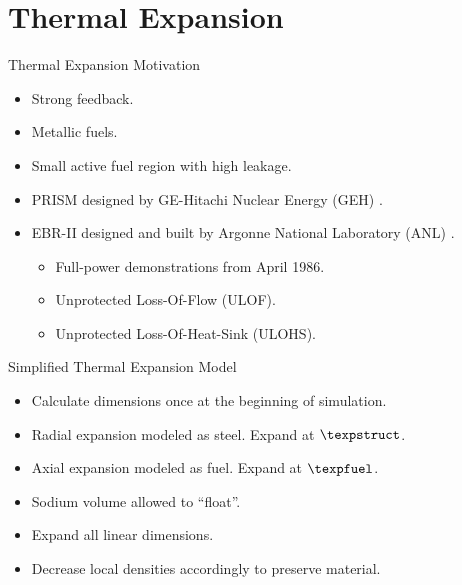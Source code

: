 \section{Thermal Expansion}
\label{sec:thermalExpansion}

\begin{frame}{Thermal Expansion Motivation}
  \begin{itemize}
    \item Strong feedback.
    \item Metallic fuels.
    \item Small active fuel region with high leakage.
    \item PRISM designed by GE-Hitachi Nuclear Energy (GEH) \cite{GEFR793}.
    \item EBR-II designed and built by Argonne National Laboratory (ANL)
      \cite{PlentifulEnergy}.
      \begin{itemize}
        \item Full-power demonstrations from April 1986.
        \item Unprotected Loss-Of-Flow (ULOF).
        \item Unprotected Loss-Of-Heat-Sink (ULOHS).
      \end{itemize}
  \end{itemize}
\end{frame}

\begin{frame}{Simplified Thermal Expansion Model}
  \begin{itemize}
    \item Calculate dimensions once at the beginning of simulation.
    \item Radial expansion modeled as steel. Expand at $\texpstruct$.
    \item Axial expansion modeled as fuel. Expand at $\texpfuel$.
    \item Sodium volume allowed to ``float''.
    \item Expand all linear dimensions.
    \item Decrease local densities accordingly to preserve material.
  \end{itemize}
\end{frame}

